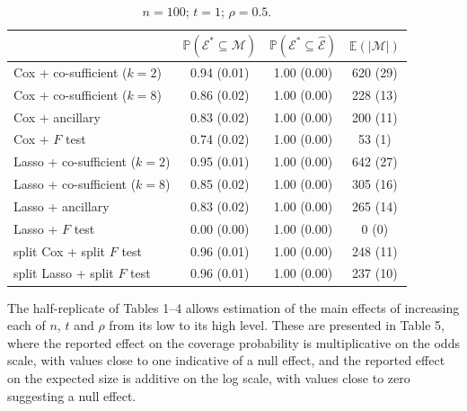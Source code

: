 \documentclass[10pt, reqno]{amsart}
\numberwithin{equation}{section}
\begin{document}
\begin{table}
	\caption{$n = 100$; $t = 1$; $\rho = 0.5$.}{
		\begin{tabular}{|l|c|c|c|}
			\hline
			& $\mathbb{P}(\mathcal E^*\subseteq \mathcal{M})$
			& $\mathbb{P}(\mathcal E^*\subseteq \hat{\mathcal{E}})$
			& $\mathbb E(\vert \mathcal{M} \vert)$ \\
			\hline
			Cox + co-sufficient ($k = 2$) & 0.94 (0.01) & 1.00 (0.00) & 620 (29) \\
			Cox + co-sufficient ($k = 8$) & 0.86 (0.02) & 1.00 (0.00) & 228 (13) \\
			Cox + ancillary               & 0.83 (0.02) & 1.00 (0.00) & 200 (11) \\
			Cox + $F$ test                & 0.74 (0.02) & 1.00 (0.00) & 53 (1) \\
			Lasso + co-sufficient ($k = 2$) & 0.95 (0.01) & 1.00 (0.00) & 642 (27) \\
			Lasso + co-sufficient ($k = 8$) & 0.85 (0.02) & 1.00 (0.00) & 305 (16) \\
			Lasso + ancillary               & 0.83 (0.02) & 1.00 (0.00) & 265 (14) \\
			Lasso + $F$ test                & 0.00 (0.00) & 1.00 (0.00) & 0 (0) \\
			split Cox + split $F$ test      & 0.96 (0.01) & 1.00 (0.00) & 248 (11) \\
			split Lasso + split $F$ test    & 0.96 (0.01) & 1.00 (0.00) & 237 (10) \\
			\hline
		\end{tabular}
		\label{tab4}
	}
\end{table}

The half-replicate of Tables 1--4 allows estimation of the main effects of increasing each of $n$, $t$ and $\rho$ from its low to its high level. These are presented in Table 5, where the reported effect on the coverage probability is multiplicative on the odds scale, with values close to one indicative of a null effect, and the reported effect on the expected size is additive on the log scale, with values close to zero suggesting a null effect. 
\end{document}

